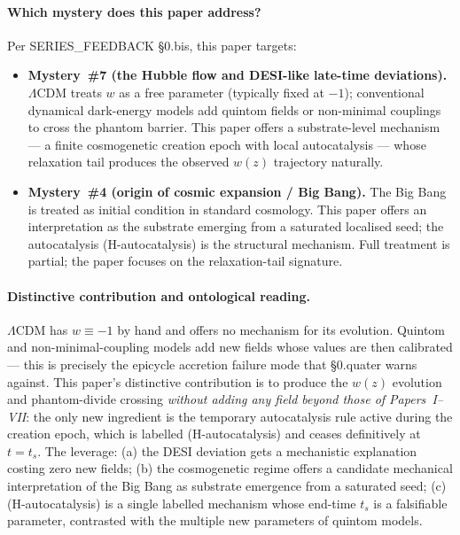 \documentclass[11pt,a4paper]{article}
\begin{document}
\paragraph{Which mystery does this paper address?}
Per SERIES\_FEEDBACK §0.bis, this paper targets:

\begin{itemize}
\item \textbf{Mystery~\#7 (the Hubble flow and DESI-like late-time deviations).} $\Lambda$CDM treats $w$ as a free parameter (typically fixed at $-1$); conventional dynamical dark-energy models add quintom fields or non-minimal couplings to cross the phantom barrier. This paper offers a substrate-level mechanism --- a finite cosmogenetic creation epoch with local autocatalysis --- whose relaxation tail produces the observed $w(z)$ trajectory naturally.
\item \textbf{Mystery~\#4 (origin of cosmic expansion / Big Bang).} The Big Bang is treated as initial condition in standard cosmology. This paper offers an interpretation as the substrate emerging from a saturated localised seed; the autocatalysis (H-autocatalysis) is the structural mechanism. Full treatment is partial; the paper focuses on the relaxation-tail signature.
\end{itemize}


\paragraph{Distinctive contribution and ontological reading.}
$\Lambda$CDM has $w \equiv -1$ by hand and offers no mechanism for its evolution. Quintom and non-minimal-coupling models add new fields whose values are then calibrated --- this is precisely the epicycle accretion failure mode that §0.quater warns against. This paper's distinctive contribution is to produce the $w(z)$ evolution and phantom-divide crossing \emph{without adding any field beyond those of Papers~I--VII}: the only new ingredient is the temporary autocatalysis rule active during the creation epoch, which is labelled (H-autocatalysis) and ceases definitively at $t = t_s$. The leverage: (a) the DESI deviation gets a mechanistic explanation costing zero new fields; (b) the cosmogenetic regime offers a candidate mechanical interpretation of the Big Bang as substrate emergence from a saturated seed; (c) (H-autocatalysis) is a single labelled mechanism whose end-time $t_s$ is a falsifiable parameter, contrasted with the multiple new parameters of quintom models.
\end{document}

